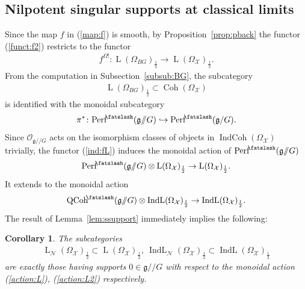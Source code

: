 \documentclass [11pt,oneside,a4paper,mathscr]{amsart}
\newtheorem{cor}[thm]{Corollary}
\theoremstyle{definition}
\newcommand{\LL}{\operatorname{L}}
\newcommand{\QCoh}{\operatorname{QCoh}}
\newcommand{\X}{\mathcal{X}}
\newcommand{\Coh}{\operatorname{Coh}}
\newcommand{\IndCoh}{\operatorname{IndCoh}}
\newcommand{\IndL}{\operatorname{IndL}}
\newcommand{\shear}{{\mathbin{\mkern-6mu\fatslash}}}
\newcommand{\ssslash}{/\!\!/}
\begin{document}
\subsection{Nilpotent singular supports at classical limits}\label{subsec:limsupp}
Since the map $f$ in (\ref{map:f}) is smooth, by Proposition~\ref{prop:pback}
the functor (\ref{funct:f2}) restricts to the functor 
\begin{align}\label{ind:fL}
    f^{\Omega!}\colon \LL(\Omega_{BG})_{\frac{1}{2}} \to \LL(\Omega_{\X})_{\frac{1}{2}}. 
\end{align}
From the computation in Subsection~\ref{subsub:BG}, the 
subcategory 
\begin{align*}
    \LL(\Omega_{BG})_{\frac{1}{2}} \subset \Coh(\Omega_{\mathcal{X}})
\end{align*}
is identified with the monoidal subcategory 
\begin{align*}
    \pi^{*}\colon \mathrm{Perf}^{\shear}(\mathfrak{g}\ssslash G) 
    \hookrightarrow \mathrm{Perf}^{\shear}(\mathfrak{g}/ G). 
\end{align*}
Since $\mathcal{O}_{\mathfrak{g}\ssslash G}$ acts on the isomorphism classes of objects in 
$\IndCoh(\Omega_{\X})$ trivially, 
the functor (\ref{ind:fL})
induces the monoidal action of $\mathrm{Perf}^{\shear}(\mathfrak{g}\ssslash G)$
\begin{align}\label{action:L}
    \mathrm{Perf}^{\shear}(\mathfrak{g}\ssslash G) \otimes \LL(\Omega_{\X})_{\frac{1} {2}} \to \LL(\Omega_{\X})_{\frac{1}{2}}.
\end{align}
It extends to the monoidal action 
\begin{align}\label{action:L2}
\QCoh^{\shear}(\mathfrak{g}\ssslash G) \otimes 
\IndL(\Omega_{\X})_{\frac{1}{2}} \to 
\IndL(\Omega_{\X})_{\frac{1}{2}}.
\end{align}
The result of Lemma~\ref{lem:ssupport} immediately implies the following: 
\begin{cor}\label{cor:nilp}
The subcategories 
\begin{align*}
    \LL_{\mathcal{N}}(\Omega_{\X})_{\frac{1}{2}} \subset \LL(\Omega_{\X})_{\frac{1}{2}}, \ 
      \IndL_{\mathcal{N}}(\Omega_{\X})_{\frac{1}{2}} \subset \IndL(\Omega_{\X})_{\frac{1}{2}}
\end{align*}
are exactly those having supports $0\in \mathfrak{g}\ssslash G$ with respect
to the monoidal action (\ref{action:L}), (\ref{action:L2}) respectively. 
\end{cor}
\end{document}
